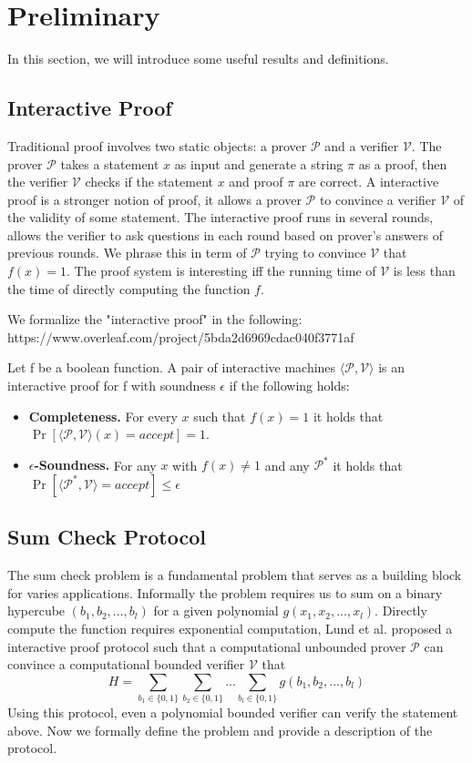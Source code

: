 \section{Preliminary}
In this section, we will introduce some useful results and definitions.
\subsection{Interactive Proof}
Traditional proof involves two static objects: a prover $\mathcal{P}$ and a verifier $\mathcal{V}$. The prover $\mathcal{P}$ takes a statement $x$ as input and generate a string $\pi$ as a proof, then the verifier $\mathcal{V}$ checks if the statement $x$ and proof $\pi$ are correct. A interactive proof is a stronger notion of proof, it allows a prover $\mathcal{P}$ to convince a verifier $\mathcal{V}$ of the validity of some statement. The interactive proof runs in several rounds, allows the verifier to ask questions in each round based on prover's answers of previous rounds. We phrase this in term of $\mathcal{P}$ trying to convince $\mathcal{V}$ that $f(x)=1$. The proof system is interesting iff the running time of $\mathcal{V}$ is less than the time of directly computing the function $f$.

We formalize the "interactive proof" in the following:
https://www.overleaf.com/project/5bda2d6969cdac040f3771af
\begin{definition}
Let f be a boolean function. A pair of interactive machines $\langle\mathcal{P}, \mathcal{V}\rangle$ is an interactive proof for f with soundness $\epsilon$ if the following holds:
\begin{itemize}
	\item {\bf Completeness.} For every $x$ such that $f(x) = 1$ it holds that $\Pr[\langle\mathcal{P}, \mathcal{V}\rangle(x)=accept]=1$.
	\item {\bf $\epsilon$-Soundness.} For any $x$ with $f(x) \neq 1$ and any $\mathcal{P}^*$ it holds that $\Pr[\langle\mathcal{P^*},\mathcal{V}\rangle=accept] \le \epsilon$
\end{itemize}
\end{definition}

\subsection{Sum Check Protocol}
The sum check problem is a fundamental problem that serves as a building block for varies applications. Informally the problem requires us to sum on a binary hypercube $(b_1, b_2, ..., b_{l})$ for a given polynomial $g(x_1, x_2, ..., x_{l})$. Directly compute the function requires exponential computation, Lund et al.\cite{sumcheck} proposed a interactive proof protocol such that a computational unbounded prover $\mathcal{P}$ can convince a computational bounded verifier $\mathcal{V}$ that $$H=\sum_{b_1\in\{0,1\}}\sum_{b_2\in\{0,1\}}...\sum_{b_{l}\in\{0,1\}}g(b_1,b_2,...,b_{l})$$
Using this protocol, even a polynomial bounded verifier can verify the statement above. Now we formally define the problem and provide a description of the protocol.


